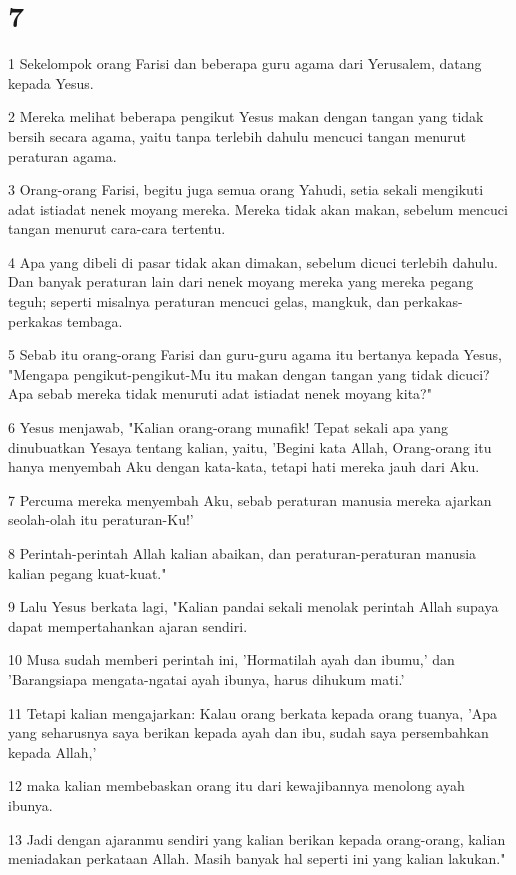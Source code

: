 \chapter{7}

\par 1 Sekelompok orang Farisi dan beberapa guru agama dari Yerusalem, datang kepada Yesus.
\par 2 Mereka melihat beberapa pengikut Yesus makan dengan tangan yang tidak bersih secara agama, yaitu tanpa terlebih dahulu mencuci tangan menurut peraturan agama.
\par 3 Orang-orang Farisi, begitu juga semua orang Yahudi, setia sekali mengikuti adat istiadat nenek moyang mereka. Mereka tidak akan makan, sebelum mencuci tangan menurut cara-cara tertentu.
\par 4 Apa yang dibeli di pasar tidak akan dimakan, sebelum dicuci terlebih dahulu. Dan banyak peraturan lain dari nenek moyang mereka yang mereka pegang teguh; seperti misalnya peraturan mencuci gelas, mangkuk, dan perkakas-perkakas tembaga.
\par 5 Sebab itu orang-orang Farisi dan guru-guru agama itu bertanya kepada Yesus, "Mengapa pengikut-pengikut-Mu itu makan dengan tangan yang tidak dicuci? Apa sebab mereka tidak menuruti adat istiadat nenek moyang kita?"
\par 6 Yesus menjawab, "Kalian orang-orang munafik! Tepat sekali apa yang dinubuatkan Yesaya tentang kalian, yaitu, 'Begini kata Allah, Orang-orang itu hanya menyembah Aku dengan kata-kata, tetapi hati mereka jauh dari Aku.
\par 7 Percuma mereka menyembah Aku, sebab peraturan manusia mereka ajarkan seolah-olah itu peraturan-Ku!'
\par 8 Perintah-perintah Allah kalian abaikan, dan peraturan-peraturan manusia kalian pegang kuat-kuat."
\par 9 Lalu Yesus berkata lagi, "Kalian pandai sekali menolak perintah Allah supaya dapat mempertahankan ajaran sendiri.
\par 10 Musa sudah memberi perintah ini, 'Hormatilah ayah dan ibumu,' dan 'Barangsiapa mengata-ngatai ayah ibunya, harus dihukum mati.'
\par 11 Tetapi kalian mengajarkan: Kalau orang berkata kepada orang tuanya, 'Apa yang seharusnya saya berikan kepada ayah dan ibu, sudah saya persembahkan kepada Allah,'
\par 12 maka kalian membebaskan orang itu dari kewajibannya menolong ayah ibunya.
\par 13 Jadi dengan ajaranmu sendiri yang kalian berikan kepada orang-orang, kalian meniadakan perkataan Allah. Masih banyak hal seperti ini yang kalian lakukan."
